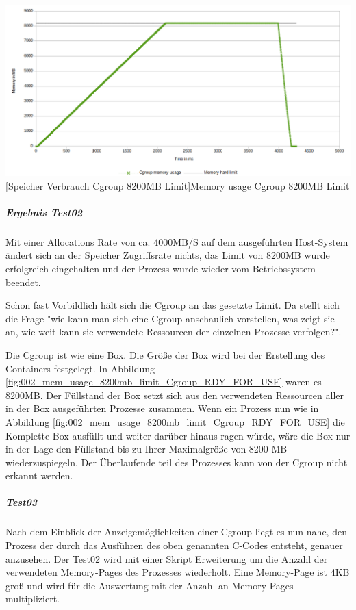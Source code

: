 \vspace{1em}
\begin{minipage}{\linewidth}
	\centering
	\includegraphics[width=1\linewidth]{pics/002_mem_usage_8200mb_limit_Cgroup_RDY_FOR_USE.png}
	[Speicher Verbrauch Cgroup 8200MB Limit]{Memory usage Cgroup 8200MB Limit}
	\label{fig:002_mem_usage_8200mb_limit_Cgroup_RDY_FOR_USE}
\end{minipage}

\subparagraph{Ergebnis Test02}
Mit einer Allocations Rate von ca. 4000MB/S auf dem ausgeführten Host-System ändert sich an der Speicher Zugriffsrate nichts, das Limit von 8200MB wurde erfolgreich eingehalten und der Prozess wurde wieder vom Betriebssystem beendet.

Schon fast Vorbildlich hält sich die Cgroup an das gesetzte Limit. Da stellt sich die Frage "wie kann man sich eine Cgroup anschaulich vorstellen, was zeigt sie an, wie weit kann sie verwendete Ressourcen der einzelnen Prozesse verfolgen?". 


Die Cgroup ist wie eine Box. Die Größe der Box wird bei der Erstellung des Containers festgelegt. In Abbildung \ref{fig:002_mem_usage_8200mb_limit_Cgroup_RDY_FOR_USE} waren es 8200MB. Der Füllstand der Box setzt sich aus den verwendeten Ressourcen aller in der Box ausgeführten Prozesse zusammen. Wenn ein Prozess nun wie in Abbildung \ref{fig:002_mem_usage_8200mb_limit_Cgroup_RDY_FOR_USE} die Komplette Box ausfüllt und weiter darüber hinaus ragen würde, wäre die Box nur in der Lage den Füllstand bis zu Ihrer Maximalgröße von 8200 MB wiederzuspiegeln. Der Überlaufende teil des Prozesses kann von der Cgroup nicht erkannt werden.

\subparagraph{Test03}
Nach dem Einblick der Anzeigemöglichkeiten einer Cgroup liegt es nun nahe, den Prozess der durch das Ausführen des oben genannten C-Codes entsteht, genauer anzusehen. Der Test02 wird mit einer Skript Erweiterung um die Anzahl der verwendeten Memory-Pages des Prozesses wiederholt. Eine Memory-Page ist 4KB groß und wird für die Auswertung mit der Anzahl an Memory-Pages multipliziert.

